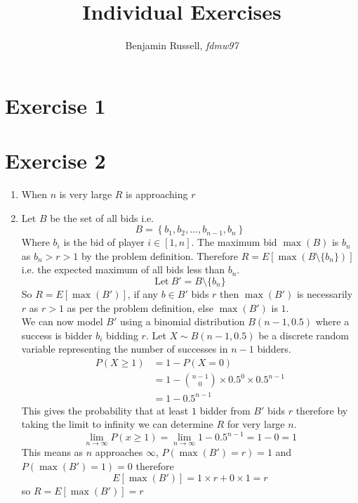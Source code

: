\documentclass[]{article}
\title{Individual Exercises}
\author{Benjamin Russell, \textit{fdmw97}}
\begin{document}
\maketitle

\section*{Exercise 1}
\section*{Exercise 2}
\begin{enumerate}
	\item When $n$ is very large $R$ is approaching $r$
	\item
	Let $B$ be the set of all bids i.e. 
	\[B=\left\{b_1,b_2,...,b_{n-1},b_n \right\}\]
	Where $b_i$ is the bid of player $i \in [1,n]$.
	The maximum bid $\max(B)$ is $b_n$ as $b_n > r > 1$ by the problem definition.
	Therefore $R=E[\max(B\setminus\{b_n\})]$ i.e. the expected maximum of all bids less than $b_n$.
	\[
	\text{Let}\ B'=B\setminus\{b_n\}
	\]
	So $R=E[\max(B')]$, if any $b\in B'$ bids $r$ then $\max(B')$ is necessarily $r$ as $r>1$ as per the problem definition, else $\max(B')$ is $1$.\\
	We can now model $B'$ using a binomial distribution $B(n-1, 0.5)$ where a success is bidder $b_i$ bidding $r$. Let $X\sim B(n-1,0.5)$ be a discrete random variable representing the number of successes in $n-1$ bidders.
	\begin{align*}
		P(X\geq 1) &= 1-P(X=0) \\
		&= 1-\binom{n-1}{0}\times0.5^0\times0.5^{n-1} \\
		&= 1-0.5^{n-1}
	\end{align*}
This gives the probability that at least $1$ bidder from $B'$ bids $r$ therefore by taking the limit to infinity we can determine $R$ for very large $n$.
\[
\lim_{n \to \infty}  P(x\geq 1) = \lim_{n \to \infty} 1-0.5^{n-1} = 1-0 = 1
\]
This means as $n$ approaches $\infty$, $P(\max(B')=r)=1$ and $P(\max(B')=1)=0$ therefore
\[
	E[\max(B')]=1\times r + 0 \times 1 = r
\]
so $R=E[\max(B')] = r$
\end{enumerate}
\end{document}
